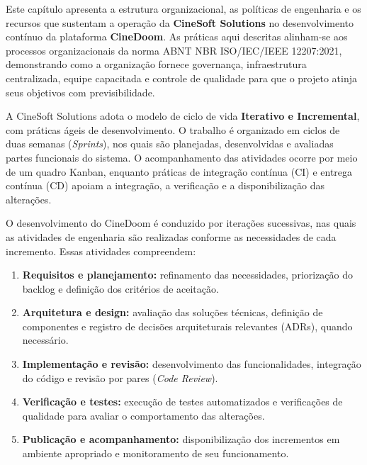 

Este capítulo apresenta a estrutura organizacional, as políticas de engenharia e os recursos que sustentam a operação da \textbf{CineSoft Solutions} no desenvolvimento contínuo da plataforma \textbf{CineDoom}. As práticas aqui descritas alinham-se aos processos organizacionais da norma ABNT NBR ISO/IEC/IEEE 12207:2021, demonstrando como a organização fornece governança, infraestrutura centralizada, equipe capacitada e controle de qualidade para que o projeto atinja seus objetivos com previsibilidade.


A CineSoft Solutions adota o modelo de ciclo de vida \textbf{Iterativo e Incremental}, com práticas ágeis de desenvolvimento. O trabalho é organizado em ciclos de duas semanas (\emph{Sprints}), nos quais são planejadas, desenvolvidas e avaliadas partes funcionais do sistema. O acompanhamento das atividades ocorre por meio de um quadro Kanban, enquanto práticas de integração contínua (CI) e entrega contínua (CD) apoiam a integração, a verificação e a disponibilização das alterações.


O desenvolvimento do CineDoom é conduzido por iterações sucessivas, nas quais as atividades de engenharia são realizadas conforme as necessidades de cada incremento. Essas atividades compreendem:

\begin{enumerate}
\item \textbf{Requisitos e planejamento:} refinamento das necessidades, priorização do backlog e definição dos critérios de aceitação.
\item \textbf{Arquitetura e design:} avaliação das soluções técnicas, definição de componentes e registro de decisões arquiteturais relevantes (ADRs), quando necessário.
\item \textbf{Implementação e revisão:} desenvolvimento das funcionalidades, integração do código e revisão por pares (\emph{Code Review}).
\item \textbf{Verificação e testes:} execução de testes automatizados e verificações de qualidade para avaliar o comportamento das alterações.
\item \textbf{Publicação e acompanhamento:} disponibilização dos incrementos em ambiente apropriado e monitoramento de seu funcionamento.
\end{enumerate}

